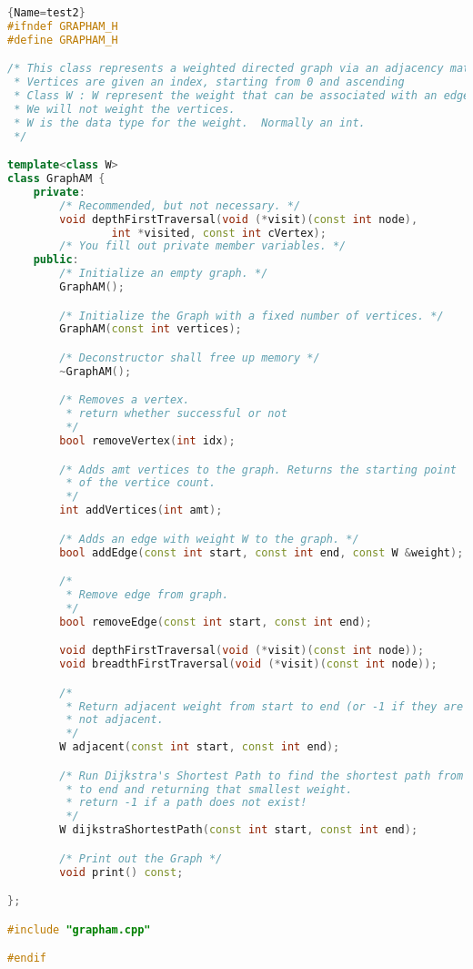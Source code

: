 \documentclass[12pt]{article}
\begin{document}
\begin{lstlisting}[language=C++]{Name=test2}
#ifndef GRAPHAM_H
#define GRAPHAM_H

/* This class represents a weighted directed graph via an adjacency matrix.
 * Vertices are given an index, starting from 0 and ascending
 * Class W : W represent the weight that can be associated with an edge.
 * We will not weight the vertices.
 * W is the data type for the weight.  Normally an int.
 */

template<class W>
class GraphAM {
    private:
        /* Recommended, but not necessary. */
        void depthFirstTraversal(void (*visit)(const int node),
                int *visited, const int cVertex);
        /* You fill out private member variables. */
    public:
        /* Initialize an empty graph. */
        GraphAM();

        /* Initialize the Graph with a fixed number of vertices. */
        GraphAM(const int vertices);

        /* Deconstructor shall free up memory */
        ~GraphAM();

        /* Removes a vertex. 
         * return whether successful or not
         */
        bool removeVertex(int idx);

        /* Adds amt vertices to the graph. Returns the starting point 
         * of the vertice count.
         */
        int addVertices(int amt);

        /* Adds an edge with weight W to the graph. */
        bool addEdge(const int start, const int end, const W &weight);

        /* 
         * Remove edge from graph.
         */
        bool removeEdge(const int start, const int end);

        void depthFirstTraversal(void (*visit)(const int node));
        void breadthFirstTraversal(void (*visit)(const int node));

        /*
         * Return adjacent weight from start to end (or -1 if they are
         * not adjacent.
         */
        W adjacent(const int start, const int end);

        /* Run Dijkstra's Shortest Path to find the shortest path from start
         * to end and returning that smallest weight.
         * return -1 if a path does not exist!
         */
        W dijkstraShortestPath(const int start, const int end);

        /* Print out the Graph */
        void print() const;

};

#include "grapham.cpp"

#endif
\end{lstlisting}
\end{document}
